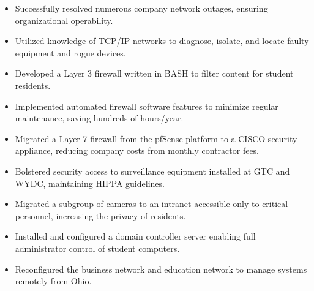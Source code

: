 \accomplishments
\begin{itemize}[leftmargin=*]
\item Successfully resolved numerous company network outages, ensuring organizational operability.
\item Utilized knowledge of TCP/IP networks to diagnose, isolate, and locate faulty equipment and rogue devices. 
\item Developed a Layer 3 firewall written in BASH to filter content for student residents.
\item Implemented automated firewall software features to minimize %
  regular maintenance, saving hundreds of hours/year.
\item Migrated a Layer 7 firewall from the pfSense platform to a CISCO %
  security appliance, reducing company costs from monthly contractor fees.
\item Bolstered security access to surveillance equipment installed at GTC and WYDC, maintaining HIPPA guidelines.
\item Migrated a subgroup of cameras to an intranet accessible only to critical personnel, increasing the privacy of residents.
\item Installed and configured a domain controller server enabling full administrator control of student computers.
\item Reconfigured the business network and education network to manage systems remotely from Ohio.
\end{itemize}
